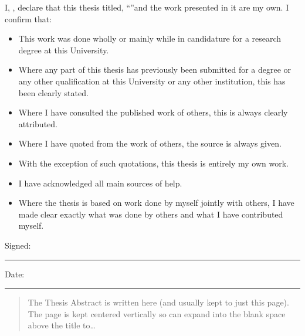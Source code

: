 \documentclass[twoside,
    11pt,
    english,
    onehalfspacing, %
parskip, %
]{PhDDoctoralThesis}
\begin{document}
    \begin{declaration}
        \addchaptertocentry{\authorshipname} %
        \noindent I, \authorname, declare that this thesis titled, \enquote{\ttitle}and the work presented in it are my own.
        I confirm that:

        \begin{itemize}
            \item This work was done wholly or mainly while in candidature for a research degree at this University.
            \item Where any part of this thesis has previously been submitted for a degree or any other qualification at this University or any other institution, this has been clearly stated.
            \item Where I have consulted the published work of others, this is always clearly attributed.
            \item Where I have quoted from the work of others, the source is always given.
            \item With the exception of such quotations, this thesis is entirely my own work.
            \item I have acknowledged all main sources of help.
            \item Where the thesis is based on work done by myself jointly with others, I have made clear exactly what was done by others and what I have contributed myself.\\
        \end{itemize}

        \noindent Signed:\\
        \rule[0.5em]{25em}{0.5pt} %

        \noindent Date:\\
        \rule[0.5em]{25em}{0.5pt} %
    \end{declaration}



    \begin{abstract}
        \addchaptertocentry{\abstractname} %
        The Thesis Abstract is written here (and usually kept to just this page).
        The page is kept centered vertically so can expand into the blank space above the title to\ldots
    \end{abstract}
\end{document}
